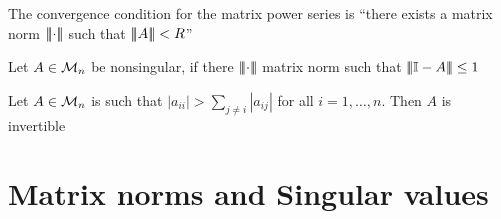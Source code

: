 \documentclass[aspectratio=169]{beamer}
\begin{document}
\begin{frame}
\begin{remark}
 The convergence condition for the matrix power series is ``there exists a matrix norm $\left|\!\left|\!\left|\cdot\right|\!\right|\!\right|$ such that $|\! |\! | A |\! |\! | <R$''
\end{remark}
\vfill
\begin{corollary}
  Let $A\in \mathcal{M}_n$ be nonsingular, if there $\left|\!\left|\!\left|\cdot\right|\!\right|\!\right|$ matrix norm such that $|\! |\! | \mathbb{I}-A|\! |\! | \leq 1$
\end{corollary}
\vfill
\begin{corollary}
  Let $A\in \mathcal{M}_n$ is such that $|a_{ii}| > \sum\limits_{j \neq i} |a_{ij}|$ for all $i = 1, \dots, n$. Then $A$ is invertible
\end{corollary}
\end{frame}



\section{Matrix norms and Singular values}
\label{sec:matrixNorms_SVD}
\end{document}
